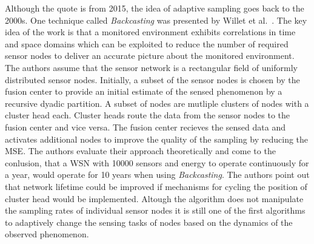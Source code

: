 \par
Although the quote is from 2015, the idea of adaptive sampling goes back to the
2000s. One technique called \textit{Backcasting} was presented by Willet et
al.~\cite{willett2004backcasting}. The key idea of the work is that a monitored
environment exhibits correlations in time and space domains which can be
exploited to reduce the number of required sensor nodes to deliver an accurate
picture about the monitored environment. The authors assume that the sensor
network is a rectangular field of uniformly distributed sensor nodes.
Initially, a subset of the sensor nodes is chosen by the fusion center to
provide an initial estimate of the sensed phenomenon by a recursive dyadic
partition. A subset of nodes are mutliple clusters of nodes with a cluster head
each. Cluster heads route the data from the sensor nodes to the fusion center
and vice versa. The fusion center recieves the sensed data and activates
additional nodes to improve the quality of the sampling by reducing the
\ac{MSE}. The authors evaluate their approach theoretically and come to the
conlusion, that a \ac{WSN} with 10000 sensors and energy to operate
continuously for a year, would operate for 10 years when using
\textit{Backcasting}. The authors point out that network lifetime could be
improved if mechanisms for cycling the position of cluster head would be
implemented. Altough the algorithm does not manipulate the sampling rates of
individual sensor nodes it is still one of the first algorithms to adaptively
change the sensing tasks of nodes based on the dynamics of the observed
phenomenon.

\par

